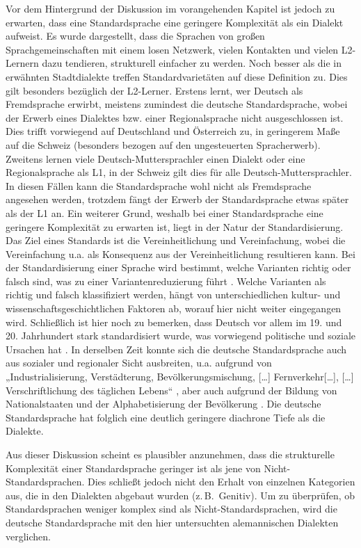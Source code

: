 Vor dem Hintergrund der Diskussion im vorangehenden Kapitel ist jedoch zu erwarten, dass eine Standardsprache eine geringere Komplexität als ein Dialekt aufweist. Es wurde dargestellt, dass die Sprachen von großen Sprachgemeinschaften mit einem losen Netzwerk, vielen Kontakten und vielen L2-Ler\-nern dazu tendieren, strukturell einfacher zu werden. Noch besser als die in  erwähnten Stadtdialekte treffen Standardvarietäten auf diese Definition zu. Dies gilt besonders bezüglich der L2-Ler\-ner. Erstens lernt, wer Deutsch als Fremdsprache erwirbt, meistens zumindest die deutsche Standardsprache, wobei der Erwerb eines Dialektes bzw. einer Regionalsprache nicht ausgeschlossen ist. Dies trifft vorwiegend auf Deutschland und Österreich zu, in geringerem Maße auf die Schweiz (besonders bezogen auf den ungesteuerten Spracherwerb). Zweitens lernen viele Deutsch-Muttersprachler einen Dialekt oder eine Regionalsprache als L1, in der Schweiz gilt dies für alle Deutsch-Muttersprachler. In diesen Fällen kann die Standardsprache wohl nicht als Fremdsprache angesehen werden, trotzdem fängt der Erwerb der Standardsprache etwas später als der L1 an. Ein weiterer Grund, weshalb bei einer Standardsprache eine geringere Komplexität zu erwarten ist, liegt in der Natur der Standardisierung. Das Ziel eines Standards ist die Vereinheitlichung und Vereinfachung, wobei die Vereinfachung u.a. als Konsequenz aus der Vereinheitlichung resultieren kann. Bei der Standardisierung einer Sprache wird bestimmt, welche Varianten richtig oder falsch sind, was zu einer Variantenreduzierung führt \citep[231]{vonPolenz1999}. Welche Varianten als richtig und falsch klassifiziert werden, hängt von unterschiedlichen kultur- und wissenschaftsgeschichtlichen Faktoren ab, worauf hier nicht weiter eingegangen wird. Schließlich ist hier noch zu bemerken, dass Deutsch vor allem im 19. und 20. Jahrhundert stark standardisiert wurde, was vorwiegend politische und soziale Ursachen hat \citep[232]{vonPolenz1999}. In derselben Zeit konnte sich die deutsche Standardsprache auch aus sozialer und regionaler Sicht ausbreiten, u.a. aufgrund von „Industrialisierung, Verstädterung, Bevölkerungsmischung, […] Fernverkehr[…], […] Verschriftlichung des täglichen Lebens“ \citep[232]{vonPolenz1999}, aber auch aufgrund der Bildung von Nationalstaaten und der Alphabetisierung der Bevölkerung \citep[233]{vonPolenz1999}. Die deutsche Standardsprache hat folglich eine deutlich geringere diachrone Tiefe als die Dialekte.

Aus dieser Diskussion scheint es plausibler anzunehmen, dass die strukturelle Komplexität einer Standardsprache geringer ist als jene von Nicht-Stan\-dard\-spra\-chen. Dies schließt jedoch nicht den Erhalt von einzelnen Kategorien aus, die in den Dialekten abgebaut wurden (z.\,B.\ Genitiv). Um zu überprüfen, ob Standardsprachen weniger komplex sind als Nicht-Stan\-dard\-spra\-chen, wird die deutsche Standardsprache mit den hier untersuchten alemannischen Dialekten verglichen.

